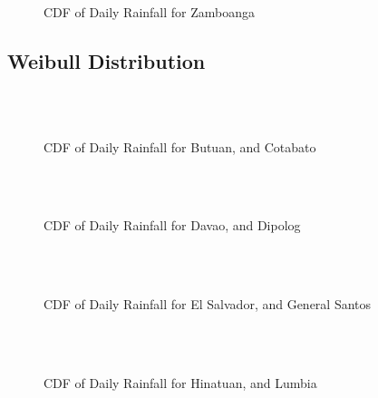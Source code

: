\begin{figure}[H]
  \centering
  \\
  \caption{CDF of Daily Rainfall for Zamboanga}
  \label{fig:daily_without_threshold_appendix_gamma_pt6}
\end{figure}

\subsection{Weibull Distribution}

\begin{figure}[H]
  \centering
  \\
  \\
  \caption{CDF of Daily Rainfall for Butuan, and Cotabato}
  \label{fig:daily_without_threshold_appendix_wb_pt1}
\end{figure}

\begin{figure}[H]
  \centering
  \\
  \\
  \caption{CDF of Daily Rainfall for Davao, and Dipolog}
  \label{fig:daily_without_threshold_appendix_wb_pt2}
\end{figure}

\begin{figure}[H]
  \centering
  \\
  \\
  \caption{CDF of Daily Rainfall for El Salvador, and General Santos}
  \label{fig:daily_without_threshold_appendix_wb_pt3}
\end{figure}

\begin{figure}[H]
  \centering
  \\
  \\
  \caption{CDF of Daily Rainfall for Hinatuan, and Lumbia}
  \label{fig:daily_without_threshold_appendix_wb_pt4}
\end{figure}

